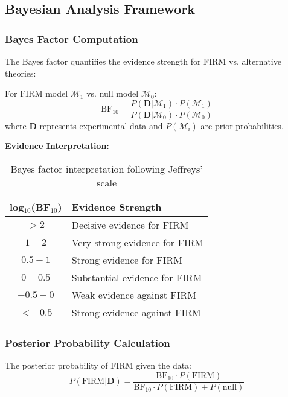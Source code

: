 \subsection{Bayesian Analysis Framework}

\subsubsection{Bayes Factor Computation}

The Bayes factor quantifies the evidence strength for FIRM vs. alternative theories:

\begin{theorem}
For FIRM model $\mathcal{M}_1$ vs. null model $\mathcal{M}_0$:
\begin{equation}
\text{BF}_{10} = \frac{P(\mathbf{D}|\mathcal{M}_1) \cdot P(\mathcal{M}_1)}{P(\mathbf{D}|\mathcal{M}_0) \cdot P(\mathcal{M}_0)}
\end{equation}
where $\mathbf{D}$ represents experimental data and $P(\mathcal{M}_i)$ are prior probabilities.
\end{theorem}

\textbf{Evidence Interpretation:}
\begin{table}[H]
\centering
\begin{tabular}{|c|l|}
\hline
\textbf{log$_{10}$(BF$_{10}$)} & \textbf{Evidence Strength} \\
\hline
$> 2$ & Decisive evidence for FIRM \\
$1 - 2$ & Very strong evidence for FIRM \\
$0.5 - 1$ & Strong evidence for FIRM \\
$0 - 0.5$ & Substantial evidence for FIRM \\
$-0.5 - 0$ & Weak evidence against FIRM \\
$< -0.5$ & Strong evidence against FIRM \\
\hline
\end{tabular}
\caption{Bayes factor interpretation following Jeffreys' scale}
\end{table}

\subsubsection{Posterior Probability Calculation}

The posterior probability of FIRM given the data:
\begin{equation}
P(\text{FIRM}|\mathbf{D}) = \frac{\text{BF}_{10} \cdot P(\text{FIRM})}{\text{BF}_{10} \cdot P(\text{FIRM}) + P(\text{null})}
\end{equation}

